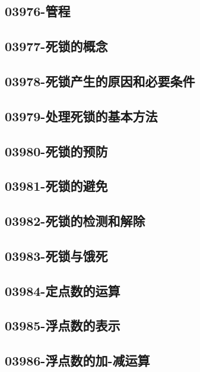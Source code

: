 \subsection{03976-管程}

\subsection{03977-死锁的概念}

\subsection{03978-死锁产生的原因和必要条件}

\subsection{03979-处理死锁的基本方法}

\subsection{03980-死锁的预防}

\subsection{03981-死锁的避免}

\subsection{03982-死锁的检测和解除}

\subsection{03983-死锁与饿死}

\subsection{03984-定点数的运算}

\subsection{03985-浮点数的表示}

\subsection{03986-浮点数的加-减运算}

